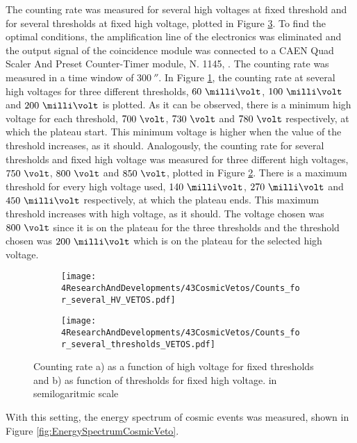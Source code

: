 The counting rate was measured for several high voltages at fixed threshold and for several thresholds at fixed high voltage, plotted in Figure \ref{fig:HVandThresholdsPLateaus}. To find the optimal conditions, the amplification line of the electronics was eliminated and the output signal of the coincidence module was connected to a CAEN Quad Scaler And Preset Counter-Timer module, N. 1145, \cite{ScalerDataSheet}. The counting rate was measured in a time window of $300~\second$. In Figure \ref{subfig:HVPLateauVetos}, the counting rate at several high voltages for three different thresholds, $60~\milli\volt$, $100~\milli\volt$ and $200~\milli\volt$ is plotted. As it can be observed, there is a minimum high voltage for each threshold, $700~\volt$, $730~\volt$ and $780~\volt$ respectively, at which the plateau start. This minimum voltage is higher when the value of the threshold increases, as it should. Analogously, the counting rate for several thresholds and fixed high voltage was measured for three different high voltages, $750~\volt$, $800~\volt$ and $850~\volt$, plotted in Figure \ref{subfig:ThresholdsPlateau}. There is a maximum threshold for every high voltage used,  $140~\milli\volt$, $270~\milli\volt$ and $450~\milli\volt$ respectively, at which the plateau ends. This maximum threshold increases with high voltage, as it should. The voltage chosen was $800~\volt$ since it is on the plateau for the three thresholds and the threshold chosen was $200~\milli\volt$ which is on the plateau for the selected high voltage. 

\begin{figure}
\centering
    \begin{subfigure}[b]{0.8\textwidth}
    \centering
    \texttt{[image: 4ResearchAndDevelopments/43CosmicVetos/Counts\_for\_several\_HV\_VETOS.pdf]}  
    \caption{\label{subfig:HVPLateauVetos}}
    \end{subfigure}
    \hfill
    \begin{subfigure}[b]{0.8\textwidth}
    \centering
    \texttt{[image: 4ResearchAndDevelopments/43CosmicVetos/Counts\_for\_several\_thresholds\_VETOS.pdf]}  
    \caption{\label{subfig:ThresholdsPlateau}}
    \end{subfigure}
 \caption{Counting rate a) as a function of high voltage for fixed thresholds and b) as function of thresholds for fixed high voltage. in semilogaritmic scale}
 \label{fig:HVandThresholdsPLateaus}
\end{figure}

With this setting, the energy spectrum of cosmic events was measured, shown in Figure \ref{fig:EnergySpectrumCosmicVeto}. 

